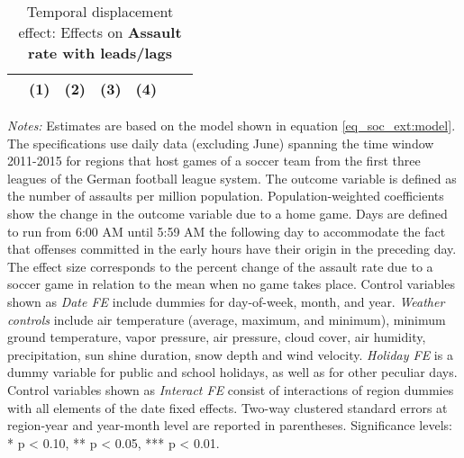 \documentclass[11pt, a4paper]{article} %
\begin{document}
\vspace*{\fill}
\begin{table}[H] \centering 
	\begin{threeparttable} \centering \caption{Temporal displacement effect: Effects on \textbf{Assault rate with leads/lags}}\label{tab_soc_ext:reg_fe_assrate_leads_lags}
		{\def\sym#1{\ifmmode^{#1}\else\(^{#1}\)\fi} 
			\begin{tabular}{l*{6}{c}}
				\toprule 
				&\multicolumn{1}{c}{(1)}&\multicolumn{1}{c}{(2)}&\multicolumn{1}{c}{(3)}&\multicolumn{1}{c}{(4)}\\
				\midrule
				 
				\bottomrule 
		\end{tabular}}
		\begin{tablenotes} 
			\item \scriptsize \emph{Notes:} Estimates are based on the model shown in equation \ref{eq_soc_ext:model}. The specifications use daily data (excluding June) spanning the time window 2011-2015 for regions that host games of a soccer team from the first three leagues of the German football league system. The outcome variable is defined as the number of assaults per million population. Population-weighted coefficients show the change in the outcome variable due to a home game. Days are defined to run from 6:00 AM until 5:59 AM the following day to accommodate the fact that offenses committed in the early hours have their origin in the preceding day. The effect size corresponds to the percent change of the assault rate due to a soccer game in relation to the mean when no game takes place. Control variables shown as \textit{Date FE} include dummies for day-of-week, month, and year. \textit{Weather controls} include air temperature (average, maximum, and minimum), minimum ground temperature, vapor pressure, air pressure, cloud cover, air humidity, precipitation, sun shine duration, snow depth and wind velocity. \textit{Holiday FE} is a dummy variable for public and school holidays, as well as for other peculiar days. Control variables shown as \textit{Interact FE} consist of interactions of region dummies with all elements of the date fixed effects. Two-way clustered standard errors at region-year and year-month level are reported in parentheses. \newline Significance levels: * p < 0.10, ** p < 0.05, *** p < 0.01.
		\end{tablenotes} 
	\end{threeparttable} 
\end{table}
\vspace*{\fill}\clearpage 
\end{document}
